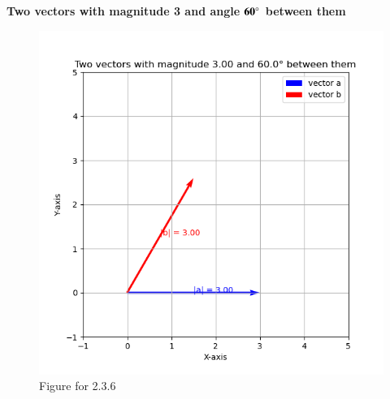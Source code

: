 \documentclass{beamer}
\begin{document}
\begin{frame}
    \vspace{5em}
\textbf{Two vectors with magnitude 3 and angle $\mathbf{60\degree}$ between them }
\begin{figure}[H]
    \centering
    \includegraphics[width=0.4\columnwidth]{figs/fig1.png}
    \caption{Figure for 2.3.6}
    \label{fig1}
\end{figure}
\end{frame}
\end{document}
